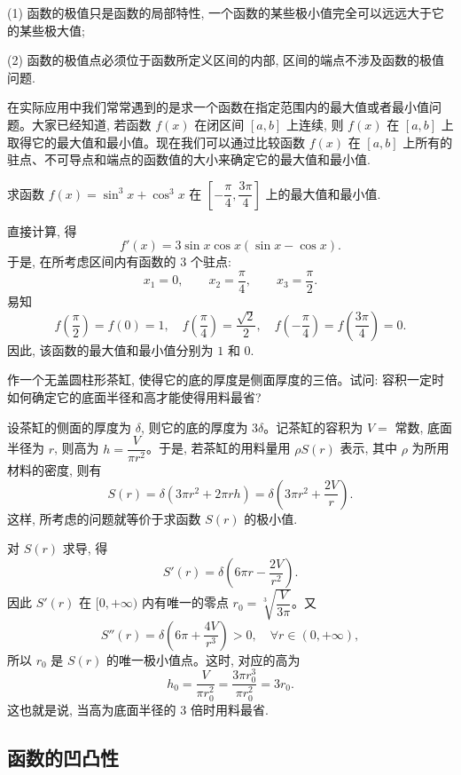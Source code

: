(1) 函数的极值只是函数的局部特性, 一个函数的某些极小值完全可以远远大于它的某些极大值;

(2) 函数的极值点必须位于函数所定义区间的内部, 区间的端点不涉及函数的极值问题.

在实际应用中我们常常遇到的是求一个函数在指定范围内的最大值或者最小值问题。大家已经知道, 若函数 $f(x)$ 在闭区间 $[a,b]$ 上连续, 则 $f(x)$ 在 $[a,b]$ 上取得它的最大值和最小值。现在我们可以通过比较函数 $f(x)$ 在 $[a,b]$ 上所有的驻点、不可导点和端点的函数值的大小来确定它的最大值和最小值.

\begin{example}\label{example:ma-5-4-6}
求函数 $f(x)=\sin^3x+\cos^3x$ 在 $\left[-\dfrac\pi4,\dfrac{3\pi}4\right]$ 上的最大值和最小值.
\end{example}


\begin{solve}
直接计算, 得
\[
  f'(x)=3\sin x\cos x(\sin x-\cos x).
\]
于是, 在所考虑区间内有函数的 $3$ 个驻点:
\[
  x_1=0,\qquad x_2=\frac\pi4,\qquad x_3=\frac\pi2.
\]
易知
\[
  f\left(\frac\pi2\right)=f(0)=1,\quad
  f\left(\frac\pi4\right)=\frac{\sqrt2}{2},\quad
  f\left(-\frac\pi4\right)=f\left(\frac{3\pi}4\right)=0.
\]
因此, 该函数的最大值和最小值分别为 $1$ 和 $0$.
\end{solve}


\begin{example}\label{example:ma-5-4-7}
作一个无盖圆柱形茶缸, 使得它的底的厚度是侧面厚度的三倍。试问: 容积一定时如何确定它的底面半径和高才能使得用料最省?
\end{example}


\begin{solve}
设茶缸的侧面的厚度为 $\delta$, 则它的底的厚度为 $3\delta$。记茶缸的容积为 $V=$ 常数, 底面半径为 $r$, 则高为 $h=\dfrac{V}{\pi r^2}$。于是, 若茶缸的用料量用 $\rho S(r)$ 表示, 其中 $\rho$ 为所用材料的密度, 则有
\[
  S(r)=\delta(3\pi r^2+2\pi rh)
  =\delta\left(3\pi r^2+\frac{2V}{r}\right).
\]
这样, 所考虑的问题就等价于求函数 $S(r)$ 的极小值.

对 $S(r)$ 求导, 得
\[
  S'(r)=\delta\left(6\pi r-\frac{2V}{r^2}\right).
\]
因此 $S'(r)$ 在 $[0,+\infty)$ 内有唯一的零点 $r_0=\sqrt[3]{\dfrac{V}{3\pi}}$。又
\[
  S''(r)=\delta\left(6\pi+\frac{4V}{r^3}\right)>0,\quad \forall r\in(0,+\infty),
\]
所以 $r_0$ 是 $S(r)$ 的唯一极小值点。这时, 对应的高为
\[
  h_0=\frac{V}{\pi r_0^2}
  =\frac{3\pi r_0^3}{\pi r_0^2}=3r_0.
\]
这也就是说, 当高为底面半径的 $3$ 倍时用料最省.
\end{solve}


\subsection{函数的凹凸性}
\label{subsec:ma-5-4-3}

